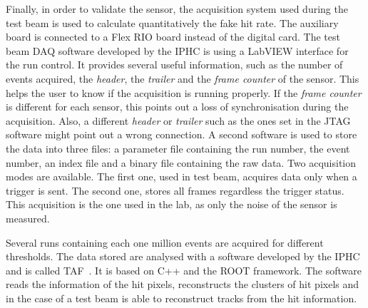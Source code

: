   Finally, in order to validate the sensor, the acquisition system used during the test beam is used to calculate quantitatively the fake hit rate.
  The auxiliary board is connected to a Flex RIO board instead of the digital card.
  The test beam \gls{DAQ} software developed by the \gls{IPHC} is using a LabVIEW interface for the run control.
  It provides several useful information, such as the number of events acquired, the \textit{header}, the \textit{trailer} and the \textit{frame counter} of the sensor.
  This helps the user to know if the acquisition is running properly.
  If the \textit{frame counter} is different for each sensor, this points out a loss of synchronisation during the acquisition.
  Also, a different \textit{header} or \textit{trailer} such as the ones set in the JTAG software might point out a wrong connection.
  A second software is used to store the data into three files: a parameter file containing the run number, the event number, an index file and a binary file containing the raw data.
  Two acquisition modes are available. 
  The first one, used in test beam, acquires data only when a trigger is sent.
  The second one, stores all frames regardless the trigger status. 
  This acquisition is the one used in the lab, as only the noise of the sensor is measured.
   
  Several runs containing each one million events are acquired for different thresholds. 
  The data stored are analysed with a software developed by the \gls{IPHC} and is called \gls{TAF}~\cite{TAF2015}.
  It is based on C++ and the ROOT framework.
  The software reads the information of the hit pixels, reconstructs the clusters of hit pixels and in the case of a test beam is able to reconstruct tracks from the hit information.

